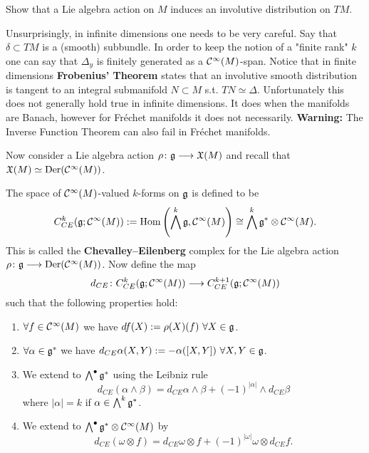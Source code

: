 \begin{ex}
  Show that a Lie algebra action on $M$ induces an involutive distribution on $TM$.
\end{ex}

\begin{rem}
  Unsurprisingly, in infinite dimensions one needs to be very careful. Say that $\delta \subset TM$ is a (smooth) subbundle. In order to keep the notion of a "finite rank" $k$ one can say that $\Delta_y$ is finitely generated as a $\mathcal{C}^{\infty}(M)$-span. Notice that in finite dimensions \textbf{Frobenius' Theorem} states that an involutive smooth distribution is tangent to an integral submanifold $N \subset M$ s.t. $TN \simeq \Delta$. Unfortunately this does not generally hold true in infinite dimensions. It does when the manifolds are Banach, however for Fréchet manifolds it does not necessarily. \textbf{Warning:} The Inverse Function Theorem can also fail in Fréchet manifolds.
\end{rem}

Now consider a Lie algebra action $\rho \colon \mathfrak{g} \longrightarrow \mathfrak{X}(M)$ and recall that $\mathfrak{X}(M) \simeq \operatorname{Der}(\mathcal{C}^{\infty}(M))$.

\begin{definition}
  The space of $\mathcal{C}^{\infty}(M)$-valued $k$-forms on $\mathfrak{g}$ is defined to be
  \begin{equation}
    C^k_{CE}(\mathfrak{g} ; \mathcal{C}^{\infty}(M)) := \operatorname{Hom}\left(\bigwedge^k \mathfrak{g}, \mathcal{C}^{\infty}(M)\right)\cong\bigwedge^k\mathfrak{g}^*\otimes\mathcal{C}^{\infty}(M).
  \end{equation}
  This is called the \textbf{Chevalley--Eilenberg} complex for the Lie algebra action $\rho \colon \mathfrak{g} \longrightarrow \operatorname{Der}(\mathcal{C}^{\infty}(M))$. Now define the map
  \begin{equation}
    d_{CE} \colon C^k_{CE}(\mathfrak{g} ; \mathcal{C}^{\infty}(M)) \longrightarrow C^{k+1}_{CE}(\mathfrak{g} ; \mathcal{C}^{\infty}(M))
  \end{equation}
  such that the following properties hold:
  \begin{enumerate}
    \item $\forall f\in \mathcal{C}^{\infty}(M)$ we have $df(X) := \rho(X)(f) \ \forall X \in \mathfrak{g}$.
    \item $\forall \alpha \in \mathfrak{g}^*$ we have $d_{CE}\alpha(X,Y) := - \alpha([X,Y]) \ \forall X,Y \in \gf$.
    \item We extend to $\bigwedge^\bullet \mathfrak{g}^*$ using the Leibniz rule
    \begin{equation}
      d_{CE} (\alpha \wedge \beta) = d_{CE}\alpha \wedge \beta + (-1)^{|\alpha|} \wedge d_{CE} \beta
    \end{equation}
    where $|\alpha| = k$ if $\alpha \in \bigwedge^k\mathfrak{g}^*$.
    \item We extend to $\bigwedge^\bullet \mathfrak{g}^* \otimes \mathcal{C}^{\infty}(M)$ by
    \begin{equation}
      d_{CE}(\omega \otimes f) = d_{CE} \omega \otimes f + (-1)^{|\omega|} \omega \otimes d_{CE} f.
    \end{equation}
  \end{enumerate}
\end{definition}

